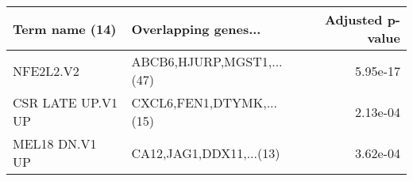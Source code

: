 \begin{tabular}{llr}
\toprule
   Term name (14) &      Overlapping genes... &  Adjusted p-value \\
\midrule
        NFE2L2.V2 & ABCB6,HJURP,MGST1,...(47) &          5.95e-17 \\
CSR LATE UP.V1 UP &  CXCL6,FEN1,DTYMK,...(15) &          2.13e-04 \\
   MEL18 DN.V1 UP &   CA12,JAG1,DDX11,...(13) &          3.62e-04 \\
\bottomrule
\end{tabular}
